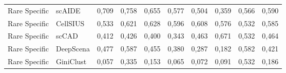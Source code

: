 {\begin{longtable}{p{}p{}rrrrrrrr}
Rare Specific & scAIDE & 0,709 & 0,758 & 0,655 & 0,577 & 0,504 & 0,359 & 0,566 & 0,590 \\
Rare Specific & CellSIUS & 0,533 & 0,621 & 0,628 & 0,596 & 0,608 & 0,576 & 0,532 & 0,585 \\
Rare Specific & scCAD & 0,412 & 0,426 & 0,400 & 0,343 & 0,463 & 0,671 & 0,532 & 0,464 \\
Rare Specific & DeepScena & 0,477 & 0,587 & 0,455 & 0,380 & 0,287 & 0,182 & 0,582 & 0,421 \\
Rare Specific & GiniClust & 0,057 & 0,335 & 0,153 & 0,065 & 0,072 & 0,091 & 0,532 & 0,186 \\
\end{longtable}
}
